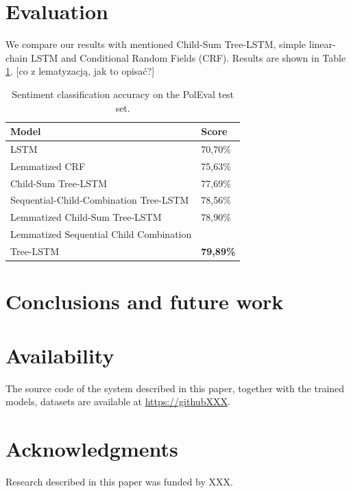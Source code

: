 \documentclass[10pt, a4paper]{article}
\begin{document}
\section{Evaluation} 
	We compare our results with mentioned Child-Sum Tree-LSTM, simple linear-chain LSTM and Conditional Random Fields (CRF).  Results are shown in Table \ref{tab:evaluation}.
	[co z lematyzacją, jak to opisać?]
\begin{table}[h]
 \begin{center}
\begin{tabular}{|l|l|}

      \hline
      Model & Score\\
      \hline
      LSTM &70,70\%\\
      \hline
      Lemmatized CRF & 75,63\%\\
      \hline
      Child-Sum Tree-LSTM &  77,69\%\\
      \hline
      Sequential-Child-Combination Tree-LSTM & 78,56\%\\
      \hline
      Lemmatized Child-Sum Tree-LSTM & 78,90\%\\
      \hline
      Lemmatized Sequential Child Combination & \\
      Tree-LSTM & \textbf{79,89\%} \\
      \hline
\end{tabular}
\caption{Sentiment classification accuracy on the PolEval test set.}
\label{tab:evaluation}
 \end{center}
\end{table}



\section{Conclusions and future work}


\section{Availability}

The source code of the system described in this paper, together with the trained models, datasets are available at \url{https://githubXXX}.


\section{Acknowledgments}

Research described in this paper was funded by XXX.


 
\end{document}

